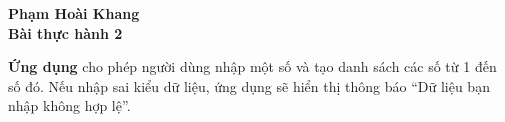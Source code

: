\documentclass{article}
\begin{document}
\begin{center}
    \Large\textbf{Phạm Hoài Khang} \\[0.5cm]
    \textbf{Bài thực hành 2}
\end{center}

\noindent\textbf{Ứng dụng} cho phép người dùng nhập một số và tạo danh sách các số từ 1 đến số đó. Nếu nhập sai kiểu dữ liệu, ứng dụng sẽ hiển thị thông báo ``Dữ liệu bạn nhập không hợp lệ''.
\end{document}
